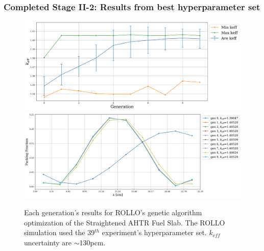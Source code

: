 \begin{frame}
    \frametitle{Completed Stage II-2: Results from best hyperparameter set}
    \begin{figure}[]
        \centering
        \includegraphics[width=0.55\linewidth]{../docs/figures/keff_conv_39.png}
        \includegraphics[width=0.55\linewidth]{../docs/figures/pf_39.png}
        \caption{Each generation's results for ROLLO's genetic algorithm 
        optimization of the Straightened \acrfull{AHTR} Fuel Slab. The \gls{ROLLO} 
        simulation used the 39$^{th}$ experiment's hyperparameter set. $k_{eff}$ 
        uncertainty are $\sim$130pcm.}
    \end{figure}
\end{frame}
